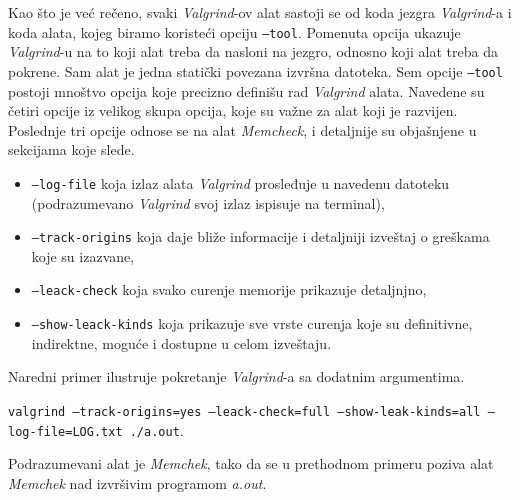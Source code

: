 \documentclass[12pt,oneside]{memoir}
\theoremstyle{plain}
\theoremstyle{definition}
\begin{document}
Kao što je već rečeno, svaki \textit{Valgrind}-ov alat sastoji se od koda jezgra \textit{Valgrind}-a i koda alata, kojeg biramo koristeći opciju \texttt{--tool}. Pomenuta opcija ukazuje \textit{Valgrind}-u na to koji alat treba da nasloni na jezgro, odnosno koji alat treba da pokrene. Sam alat je jedna statički povezana izvršna datoteka. Sem opcije \texttt{--tool} postoji mnoštvo opcija koje precizno definišu rad \textit{Valgrind} alata. Navedene su četiri opcije iz velikog skupa opcija, koje su važne za alat koji je razvijen. Poslednje tri opcije odnose se na alat \textit{Memcheck}, i detaljnije su objašnjene u sekcijama koje slede.
\begin{itemize}
\item \texttt{--log-file}  koja izlaz alata \textit{Valgrind} prosleđuje u navedenu datoteku (podrazumevano \textit{Valgrind} svoj izlaz ispisuje na terminal),
\item \texttt{--track-origins} koja daje bliže informacije i detaljniji izveštaj o greškama koje su izazvane, 
\item \texttt{--leack-check} koja svako curenje memorije prikazuje detaljnjno,
\item \texttt{--show-leack-kinds} koja prikazuje sve vrste curenja koje su definitivne, indirektne, moguće i dostupne u celom izveštaju.
\end{itemize} 
Naredni primer ilustruje pokretanje \textit{Valgrind}-a sa dodatnim argumentima.
\begin{center}
\texttt{valgrind --track-origins=yes --leack-check=full --show-leak-kinds=all --log-file=LOG.txt ./a.out}.
\end{center}
Podrazumevani alat je \textit{Memchek}, tako da se u prethodnom primeru poziva alat \textit{Memchek} nad izvršivim programom \textit{a.out}.
\end{document}
